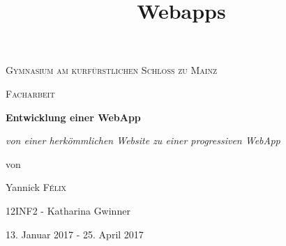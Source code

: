 \documentclass[a4paper,12pt,ngerman,listof=numbered]{scrartcl}      %
\title{Webapps}  %
\begin{document}
	
	\begin{titlepage}
		\centering
		{\scshape\Large Gymnasium am kurf\"{u}rstlichen Schloss zu Mainz \par}
		\vspace{0.5cm}
		{\scshape\Large Facharbeit\par}
		\vspace{2.5cm}
		{\huge\bfseries Entwicklung einer WebApp\par}
		\vspace{1cm}
		{\Large\itshape von einer herkömmlichen Website zu einer progressiven WebApp\par}
		\vfill
		von\par
		Yannick \textsc{F\'elix}\par
		{\small 12INF2 - Katharina Gwinner}
		
		\vspace{3cm}
		
		{\large 13. Januar 2017 - 25. April 2017 \par}
		\newpage
	\end{titlepage}
	
	\setcounter{page}{1}
\end{document}
